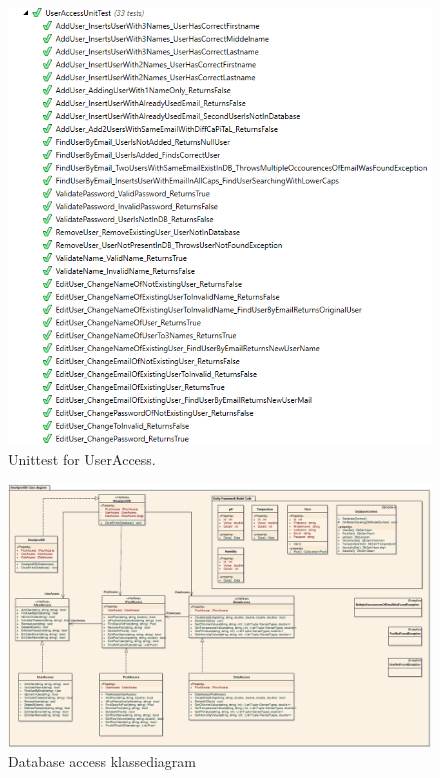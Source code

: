 \begin{figure}[H]
\centering
\includegraphics[width=0.8\linewidth]{figs/test/useraccessunittest_appendix.png}
\caption{Unittest for UserAccess.}
\label{fig:useraccessunittest_appendix}
\end{figure}

\begin{landscape}
	\begin{figure}[H]
		\centering
		\includegraphics[width=\linewidth]{figs/implementering/databaseFullClass.PNG}
		\caption{Database access klassediagram}
		\label{fig:databaseFullClass}
	\end{figure}
\end{landscape}

